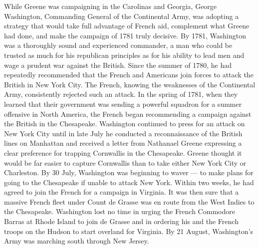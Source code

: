 While Greene was campaigning in the Carolinas and Georgia, George Washington,
Commanding General of the Continental Army, was adopting a strategy that would take
full advantage of French aid, complement what Greene had done, and make the campaign
of 1781 truly decisive. By 1781, Washington was a thoroughly sound and experienced
commander, a man who could be trusted as much for his republican principles as for his
ability to lead men and wage a prudent war against the British. Since the summer of 1780,
he had repeatedly recommended that the French and Americans join forces to attack the
British in New York City. The French, knowing the weaknesses of the Continental Army,
consistently rejected such an attack. In the spring of 1781, when they learned that their
government was sending a powerful squadron for a summer offensive in North America,
the French began recommending a campaign against the British in the Chesapeake.
Washington continued to press for an attack on New York City until in late July he
conducted a reconnaissance of the British lines on Manhattan and received a letter from
Nathanael Greene expressing a clear preference for trapping Cornwallis in the Chesapeake.
Greene thought it would be far easier to capture Cornwallis than to take either New York
City or Charleston. By 30 July, Washington was beginning to waver — to make plans for
going to the Chesapeake if unable to attack New York. Within two weeks, he had agreed
to join the French for a campaign in Virginia. It was then sure that a massive French fleet
under Count de Grasse was en route from the West Indies to the Chesapeake. Washington
lost no time in urging the French Commodore Barras at Rhode Island to join de Grasse and
in ordering his and the French troops on the Hudson to start overland for Virginia. By 21
August, Washington's Army was marching south through New Jersey.


